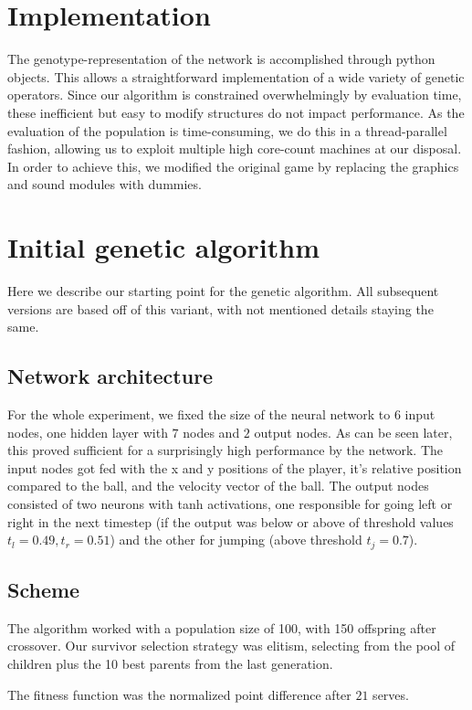 \documentclass[11pt,a4paper]{scrartcl}
\begin{document}
\section{Implementation}
The genotype-representation of the network is accomplished through python objects. This allows a straightforward implementation of a wide variety of genetic operators. Since our algorithm is constrained overwhelmingly by evaluation time, these inefficient but easy to modify structures do not impact performance.
As the evaluation of the population is time-consuming, we do this in a thread-parallel fashion, allowing us to exploit multiple high core-count machines at our disposal. In order to achieve this, we modified the original game by replacing the graphics and sound modules with dummies.

\section{Initial genetic algorithm}
Here we describe our starting point for the genetic algorithm. All subsequent versions are based off of this variant, with not mentioned details staying the same.

\subsection{Network architecture}

For the whole experiment, we fixed the size of the neural network to $6$ input nodes, one hidden layer with $7$ nodes and $2$ output nodes. As can be seen later, this proved sufficient for a surprisingly high performance by the network. The input nodes got fed with the x and y positions of the player, it's relative position compared to the ball, and the velocity vector of the ball.
The output nodes consisted of two neurons with tanh activations, one responsible for going left or right in the next timestep (if the output was below or above of threshold values $t_l = 0.49, t_r = 0.51$) and the other for jumping (above threshold $t_j = 0.7$).

\subsection{Scheme}
The algorithm worked with a population size of 100, with 150 offspring after crossover. Our survivor selection strategy was elitism, selecting from the pool of children plus the 10 best parents from the last generation.

The fitness function was the normalized point difference after $21$ serves.
\end{document}
